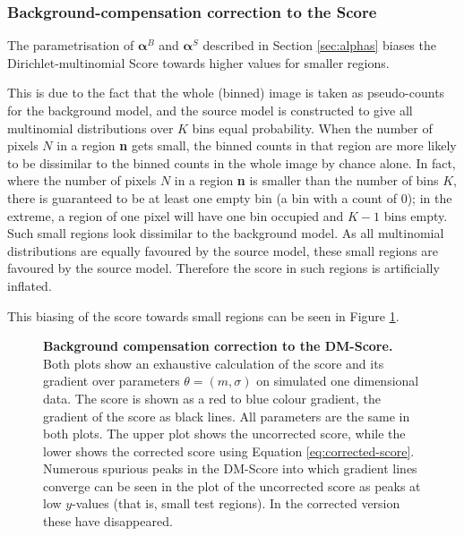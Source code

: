 \subsubsection{Background-compensation correction to the Score}

The parametrisation of $\boldsymbol{\alpha}^B$ and $\boldsymbol{\alpha}^S$ described in Section \ref{sec:alphas} biases the Dirichlet-multinomial Score towards higher values for smaller regions. 

This is due to the fact that the whole (binned) image is taken as pseudo-counts for the background model, and the source model is constructed to give all multinomial distributions over $K$ bins equal probability. When the number of pixels $N$ in a region \textbf{n} gets small, the binned counts in that region are more likely to be dissimilar to the binned counts in the whole image by chance alone. In fact, where the number of pixels $N$ in a region \textbf{n} is smaller than the number of bins $K$, there is guaranteed to be at least one empty bin (a bin with a count of $0$); in the extreme, a region of one pixel will have one bin occupied and $K-1$ bins empty. Such small regions look dissimilar to the background model. As all multinomial distributions are equally favoured by the source model, these small regions are favoured by the source model. Therefore the score in such regions is artificially inflated.

This biasing of the score towards small regions can be seen in Figure \ref{fig:background-correction}.

\begin{figure}
\centering
{}
\caption[Background compensation correction to the DM-Score]{\textbf{Background compensation correction to the DM-Score.} Both plots show an exhaustive calculation of the score and its gradient over parameters $\theta = (m,\sigma)$ on simulated one dimensional data. The score is shown as a red to blue colour gradient, the gradient of the score as black lines. All parameters are the same in both plots. The upper plot shows the uncorrected score, while the lower shows the corrected score using Equation \ref{eq:corrected-score}. Numerous spurious peaks in the DM-Score into which gradient lines converge can be seen in the plot of the uncorrected score as peaks at low $y$-values (that is, small test regions). In the corrected version these have disappeared.}
\label{fig:background-correction}
\end{figure}

